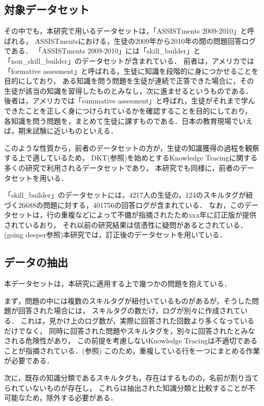 \subsection{対象データセット}
その中でも，本研究で用いるデータセットは，「ASSISTments 2009-2010」と呼ばれる，
ASSISTmentsにおける，生徒の2009年から2010年の間の問題回答ログである．
「ASSISTments 2009-2010」には「skill_builder」と「non_skill_builder」のデータセットが含まれている．
前者は，アメリカでは「formative assesment」と呼ばれる，生徒に知識を段階的に身につかせることを目的にしており，
ある知識を問う問題を生徒が連続で正答できた場合に，その生徒が該当の知識を習得したものとみなし，次に進ませるというものである．
後者は，アメリカでは「summative assesment」と呼ばれ，生徒がそれまで学んできたことを正しく身につけられているかを確認することを目的にしており，
各知識を問う問題を，まとめて生徒に課すものである．日本の教育現場でいえば，期末試験に近いものといえる．

このような性質から，前者のデータセットの方が，生徒の知識獲得の過程を観察する上で適しているため，
DKT(参照)を始めとするKnowledge Tracingに関する多くの研究で利用されるデータセットであり，
本研究でも同様に，前者のデータセットを用いる．

「skill_builder」のデータセットには，4217人の生徒の，124のスキルタグが紐づく26688の問題に対する，401756の回答ログが含まれている．
なお，このデータセットは，行の重複などによって不備が指摘されたためxxx年に訂正版が提供されているおり，
それ以前の研究結果は信憑性に疑問があるとされている．(going deeper参照)本研究では，訂正後のデータセットを用いている．


\subsection{データの抽出}
本データセットは，本研究に適用する上で幾つかの問題を抱えている．

まず，問題の中には複数のスキルタグが紐付いているものがあるが，そうした問題が回答された場合には，
スキルタグの数だけ，ログが別々に作成されている．
これは，見かけ上のログ数が，実際に回答された回数より多くなっているだけでなく，
同時に回答された問題やスキルタグを，別々に回答されたとみなされる危険性があり，
この前提を考慮しないKnowledge Tracingは不適切であることが指摘されている．(参照)
このため，重複している行を一つにまとめる作業が必要である．

次に，既存の知識分類であるスキルタグも，存在はするものの，名前が割り当てられていないものが存在し，
これらは抽出された知識分類と比較することが不可能なため，除外する必要がある．

